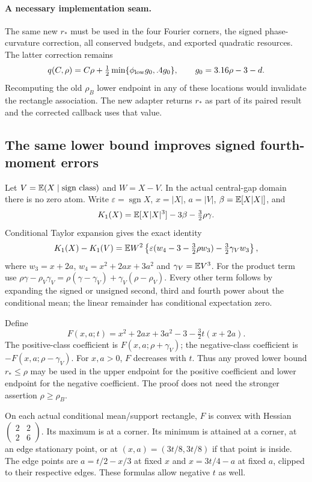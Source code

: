 \paragraph{A necessary implementation seam.}
The same new $r_*$ must be used in the four Fourier corners, the signed
phase-curvature correction, all conserved budgets, and exported quadratic
resources. The latter correction remains
\[
 q(C,\rho)=C\rho+\tfrac12\min\{\phi_{\rm low}g_0,.4g_0\},
 \qquad g_0=3.16\rho-3-d.
\]
Recomputing the old $\rho_B$ lower endpoint in any of these locations would
invalidate the rectangle association. The new adapter returns $r_*$ as
part of its paired result and the corrected callback uses that value.

\subsection*{The same lower bound improves signed fourth-moment errors}
Let $V=\mathbb E(X\mid\text{sign class})$ and $W=X-V$. In the actual central-gap
domain there is no zero atom. Write $\varepsilon=\operatorname{sgn}X$,
$x=|X|$, $a=|V|$, $\beta=\mathbb E[X|X|]$, and
\[
 K_1(X)=\mathbb E[X|X|^3]-3\beta-\tfrac32\rho\gamma.
\]
Conditional Taylor expansion gives the exact identity
\[
 K_1(X)-K_1(V)=\mathbb E W^2\left\{
 \varepsilon(w_4-3-\tfrac32\rho w_3)
                  -\tfrac32\gamma_V w_3\right\},
\]
where $w_3=x+2a$, $w_4=x^2+2ax+3a^2$ and $\gamma_V=\mathbb E V^3$.
For the product term use
$\rho\gamma-\rho_V\gamma_V
=\rho(\gamma-\gamma_V)+\gamma_V(\rho-\rho_V)$.
Every other term follows by expanding the signed or unsigned second,
third and fourth power about the conditional mean; the linear remainder
has conditional expectation zero.

Define
\[
 F(x,a;t)=x^2+2ax+3a^2-3-\tfrac32t(x+2a).
\]
The positive-class coefficient is $F(x,a;\rho+\gamma_V)$; the
negative-class coefficient is $-F(x,a;\rho-\gamma_V)$.
For $x,a>0$, $F$ decreases with $t$. Thus any proved lower bound
$r_*\le\rho$ may be used in the upper endpoint for the positive
coefficient and lower endpoint for the negative coefficient. The proof
does not need the stronger assertion $\rho\ge\rho_B$.

On each actual conditional mean/support rectangle, $F$ is convex with
Hessian $\left(\begin{smallmatrix}2&2\\2&6\end{smallmatrix}\right)$.
Its maximum is at a corner. Its minimum is attained at a corner, at an
edge stationary point, or at $(x,a)=(3t/8,3t/8)$ if that point is inside.
The edge points are $a=t/2-x/3$ at fixed $x$ and
$x=3t/4-a$ at fixed $a$, clipped to their respective edges. These formulas
allow negative $t$ as well.

